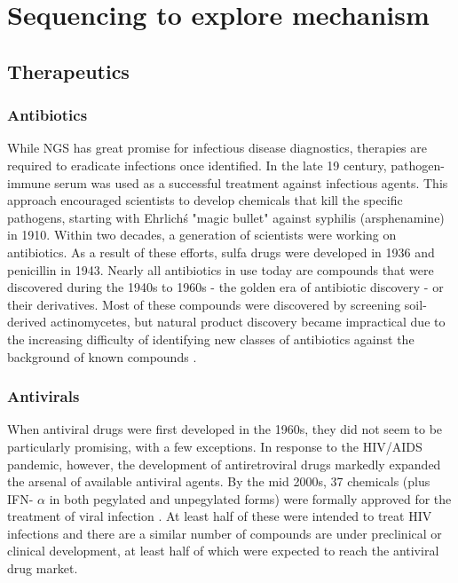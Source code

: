 \chapter{Sequencing to explore mechanism}

\section{Therapeutics}
 
\subsection{Antibiotics}

While NGS has great promise for infectious disease diagnostics, therapies are required to eradicate infections once identified. In the late 19 century, pathogen-immune serum was used as a successful treatment against infectious agents. This approach encouraged scientists to develop chemicals that kill the specific pathogens, starting with Ehrlich\'s "magic bullet" against syphilis (arsphenamine) in 1910. Within two decades, a generation of scientists were working on antibiotics. As a result of these efforts, sulfa drugs were developed in 1936 and penicillin in 1943. Nearly all antibiotics in use today are compounds that were discovered during the 1940s to 1960s - the golden era of antibiotic discovery - or their derivatives. Most of these compounds were discovered by screening soil-derived actinomycetes, but natural product discovery became impractical due to the increasing difficulty of identifying new classes of antibiotics against the background of known compounds \cite{Lewis:2013bp}.

\subsection{Antivirals}

When antiviral drugs were first developed in the 1960s, they did not seem to be particularly promising, with a few exceptions. In response to the HIV/AIDS pandemic, however, the development of antiretroviral drugs markedly expanded the arsenal of available antiviral agents. By the mid 2000s, 37 chemicals (plus IFN- $\alpha$ in both pegylated and unpegylated forms) were formally approved for the treatment of viral infection \cite{Clercq:2004ba}. At least half of these were intended to treat HIV infections and there are a similar number of compounds are under preclinical or clinical development, at least half of which were expected to reach the antiviral drug market.

